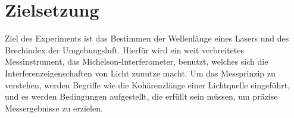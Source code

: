 \section{Zielsetzung}
\label{sec:Zielsetzung}

Ziel des Experiments ist das Bestimmen der Wellenlänge eines Lasers und des Brechindex der Umgebungsluft. 
Hierfür wird ein weit verbreitetes Messinstrument, das Michelson-Interferometer, benutzt, welches sich die Interferenzeigenschaften 
von Licht zunutze macht. 
Um das Messprinzip zu verstehen, werden Begriffe wie die Kohärenzlänge einer Lichtquelle eingeführt, und es werden Bedingungen aufgestellt, 
die erfüllt sein müssen, um präzise Messergebnisse zu erzielen. 
